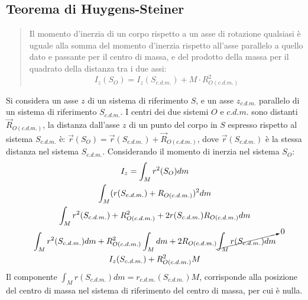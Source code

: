 \documentclass{article}
\numberwithin{equation}{subsection}
\begin{document}
\subsection{Teorema di Huygens-Steiner}
\begin{quotation}
    Il momento d'inerzia di un corpo rispetto a un asse di 
    rotazione qualsiasi è uguale alla somma del momento d'inerzia rispetto all'asse parallelo a quello dato e 
    passante per il centro di massa, e del prodotto della massa 
    per il quadrato della distanza tra i due assi:
    \begin{equation}
        I_z(S_O)=I_z(S_{c.d.m.})+M\cdot R^2_{O(c.d.m.)}
    \end{equation}
\end{quotation}
Si considera un asse $z$ di un sistema di riferimento $S$, e 
un asse $z_{c.d.m.}$ parallelo di un sistema di riferimento $S_{c.d.m.}$. 
I centri dei due sistemi $O$ e $c.d.m.$ sono distanti $\vec{R}_{O(c.d.m.)}$, 
la distanza dall'asse $z$ di un punto del corpo in $S$ espresso rispetto al 
sistema $S_{c.d.m.}$ è: $\vec{r}(S_O)=\vec{r}(S_{c.d.m.})+\vec{R}_{O(c.d.m.)}$,  
dove $\vec{r}(S_{c.d.m.})$ è la stessa distanza nel sistema $S_{c.d.m.}$. 
Considerando il momento di inerzia nel sistema $S_O$: 
\begin{gather*}
    I_z=\displaystyle\int_M {r}^2(S_O)dm\\
    \int_M({r}(S_{c.d.m.})+{R}_{O(c.d.m.)})^2dm\\
    \int_M r^2(S_{c.d.m.})+R_{O(c.d.m.)}^2+2r(S_{c.d.m.})R_{O(c.d.m.)}dm\\
    \int_M r^2(S_{c.d.m.})dm+R_{O(c.d.m.)}^2\int_M dm+2R_{O(c.d.m.)}\cancelto{0}{\int_Mr(S_{c.d.m.})dm}\\
    I_z(S_{c.d.m.})+R_{O(c.d.m.)}^2M
\end{gather*}
Il componente $\displaystyle\int_M r(S_{c.d.m.})dm=r_{c.d.m.}(S_{c.d.m.})M$, corrisponde alla posizione del centro di massa nel sistema di riferimento del centro di massa, per cui è nulla. 
\end{document}
